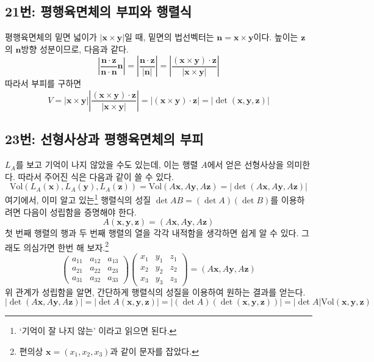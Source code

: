 \documentclass{scrartcl}
\begin{document}
\subsection{21번: 평행육면체의 부피와 행렬식}
평행육면체의 밑면 넓이가 \(\left|\mathbf{x}\times\mathbf{y}\right|\)일 때, 밑면의 법선벡터는 \(\mathbf{n}=\mathbf{x}\times\mathbf{y}\)이다. 높이는 \(\mathbf{z}\)의 \(\mathbf{n}\)방향 성분이므로, 다음과 같다.
\[\left|\frac{\mathbf{n}\cdot\mathbf{z}}{\mathbf{n}\cdot\mathbf{n}}\mathbf{n}\right|=\left|\frac{\mathbf{n}\cdot\mathbf{z}}{\left|\mathbf{n}\right|}\right|=\left|\frac{(\mathbf{x}\times\mathbf{y})\cdot\mathbf{z}}{\left|\mathbf{x}\times\mathbf{y}\right|}\right|\]
따라서 부피를 구하면
\[V=\left|\mathbf{x}\times\mathbf{y}\right|\left|\frac{(\mathbf{x}\times\mathbf{y})\cdot\mathbf{z}}{\left|\mathbf{x}\times\mathbf{y}\right|}\right|=\left|(\mathbf{x}\times\mathbf{y})\cdot\mathbf{z}\right|=\left|\det(\mathbf{x},\mathbf{y},\mathbf{z})\right|\]

\subsection{23번: 선형사상과 평행육면체의 부피}
\(L_A\)를 보고 기억이 나지 않았을 수도 있는데, 이는 행렬 \(A\)에서 얻은 선형사상을 의미한다. 따라서 주어진 식은 다음과 같이 쓸 수 있다.
\[\text{Vol}(L_A(\mathbf{x}),L_A(\mathbf{y}),L_A(\mathbf{z}))=\text{Vol}(A\mathbf{x},A\mathbf{y},A\mathbf{z})=\left|\det(A\mathbf{x},A\mathbf{y},A\mathbf{z})\right|\]
여기에서, 이미 알고 있는\footnote{`기억이 잘 나지 않는' 이라고 읽으면 된다.} 행렬식의 성질 \(\det AB=(\det A)(\det B)\)를 이용하려면 다음이 성립함을 증명해야 한다.
\[A(\mathbf{x},\mathbf{y},\mathbf{z})=(A\mathbf{x},A\mathbf{y},A\mathbf{z})\]
첫 번째 행렬의 행과 두 번째 행렬의 열을 각각 내적함을 생각하면 쉽게 알 수 있다. 그래도 의심가면 한번 해 보자.\footnote{편의상 \(\mathbf{x}=(x_1,x_2,x_3)\)과 같이 문자를 잡았다.}
\[\begin{pmatrix}
a_{11} & a_{12} & a_{13} \\
a_{21} & a_{22} & a_{23} \\
a_{31} & a_{32} & a_{33}
\end{pmatrix}\begin{pmatrix}
x_1 & y_1 & z_1 \\
x_2 & y_2 & z_2 \\
x_3 & y_3 & z_3
\end{pmatrix}=(A\mathbf{x},A\mathbf{y},A\mathbf{z})\]
위 관계가 성립함을 알면, 간단하게 행렬식의 성질을 이용하여 원하는 결과를 얻는다.
\[\left|\det(A\mathbf{x},A\mathbf{y},A\mathbf{z})\right|=\left|\det A(\mathbf{x},\mathbf{y},\mathbf{z})\right|=\left|(\det A)(\det(\mathbf{x},\mathbf{y},\mathbf{z}))\right|=\left|\det A\right|\text{Vol}(\mathbf{x},\mathbf{y},\mathbf{z})\]
\end{document}
